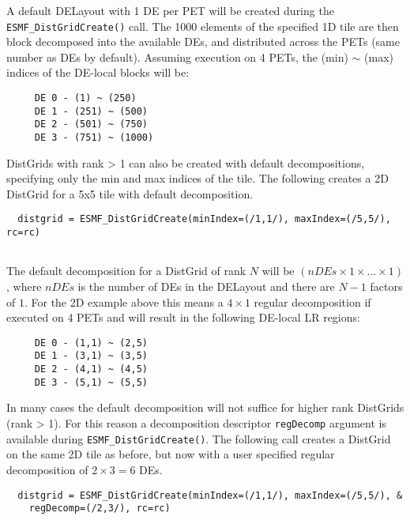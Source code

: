 
   A default DELayout with 1 DE per PET will be created during the
   {\tt ESMF\_DistGridCreate()} call. The 1000 elements of the specified 1D tile
   are then block decomposed into the available DEs, and distributed across the
   PETs (same number as DEs by default).
   Assuming execution on 4 PETs, the (min) $\sim$ (max) indices of the DE-local
   blocks will be:
   \begin{verbatim}
     DE 0 - (1) ~ (250)
     DE 1 - (251) ~ (500)
     DE 2 - (501) ~ (750)
     DE 3 - (751) ~ (1000)
   \end{verbatim}
  
   DistGrids with rank > 1 can also be created with default decompositions,
   specifying only the min and max indices of the tile. The following creates a
   2D DistGrid for a 5x5 tile with default decomposition. 

 \begin{verbatim}
  distgrid = ESMF_DistGridCreate(minIndex=(/1,1/), maxIndex=(/5,5/), rc=rc)
 
\end{verbatim}
 

   The default decomposition for a DistGrid of rank $N$ will be $ (nDEs \times 1
   \times ... \times 1) $, where $nDEs$ is the number of DEs in the DELayout
   and there are $N-1$ factors of $1$. For the 2D example above this means
   a $4 \times 1$ regular decomposition if executed on 4 PETs and will result
   in the following DE-local LR regions:
   \begin{verbatim}
     DE 0 - (1,1) ~ (2,5)
     DE 1 - (3,1) ~ (3,5)
     DE 2 - (4,1) ~ (4,5)
     DE 3 - (5,1) ~ (5,5)
   \end{verbatim}
  
   In many cases the default decomposition will not suffice for higher rank
   DistGrids (rank > 1). For this reason a decomposition descriptor 
   {\tt regDecomp} argument is available during {\tt ESMF\_DistGridCreate()}. The
   following call creates a DistGrid on the same 2D tile as before, but now with
   a user specified regular decomposition of $2 \times 3 = 6 $ DEs. 

 \begin{verbatim}
  distgrid = ESMF_DistGridCreate(minIndex=(/1,1/), maxIndex=(/5,5/), &
    regDecomp=(/2,3/), rc=rc)
 
\end{verbatim}
 
